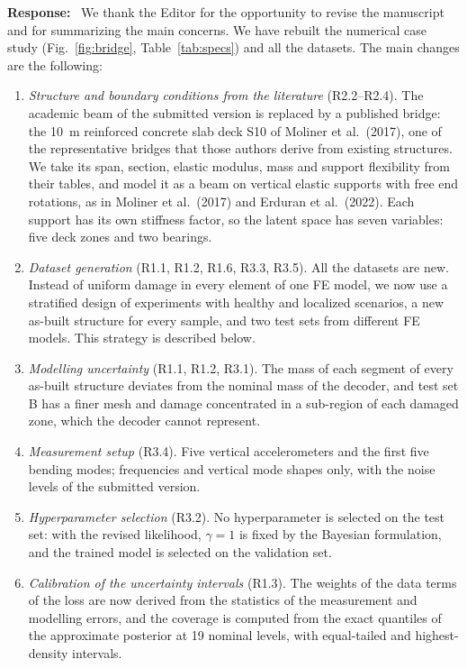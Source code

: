 \documentclass[11pt]{article}
\newenvironment{response}{\par\smallskip\noindent\color{resp}\textbf{Response:}\ }{\par}
\begin{document}
\begin{response}
We thank the Editor for the opportunity to revise the manuscript and for summarizing the main concerns. We have
rebuilt the numerical case study (Fig.~\ref{fig:bridge}, Table~\ref{tab:specs}) and all the datasets. The main changes
are the following:
\begin{enumerate}[leftmargin=*]
\item \emph{Structure and boundary conditions from the literature} (R2.2--R2.4). The academic beam of the submitted version is
replaced by a published bridge: the 10~m reinforced concrete slab deck S10 of Moliner et al.\ (2017), one of the
representative bridges that those authors derive from existing structures. We take its span, section, elastic modulus,
mass and support flexibility from their tables, and model it as a beam on vertical elastic supports with free end rotations,
as in Moliner et al.\ (2017) and Erduran et al.\ (2022). Each support has its own stiffness factor, so the latent space has
seven variables: five deck zones and two bearings.
\item \emph{Dataset generation} (R1.1, R1.2, R1.6, R3.3, R3.5). All the datasets are new. Instead of uniform damage in every
element of one FE model, we now use a stratified design of experiments with healthy and localized scenarios, a new as-built
structure for every sample, and two test sets from different FE models. This strategy is described below.
\item \emph{Modelling uncertainty} (R1.1, R1.2, R3.1). The mass of each segment of every as-built structure deviates from the
nominal mass of the decoder, and test set B has a finer mesh and damage concentrated in a sub-region of each damaged zone,
which the decoder cannot represent.
\item \emph{Measurement setup} (R3.4). Five vertical accelerometers and the first five bending modes; frequencies and vertical
mode shapes only, with the noise levels of the submitted version.
\item \emph{Hyperparameter selection} (R3.2). No hyperparameter is selected on the test set: with the revised
likelihood, $\gamma=1$ is fixed by the Bayesian formulation, and the trained model is selected on the validation set.
\item \emph{Calibration of the uncertainty intervals} (R1.3). The weights of the data terms of the loss are now derived
from the statistics of the measurement and modelling errors, and the coverage is computed from the exact quantiles of
the approximate posterior at 19 nominal levels, with equal-tailed and highest-density intervals.

\end{enumerate}
\end{response}
\end{document}
